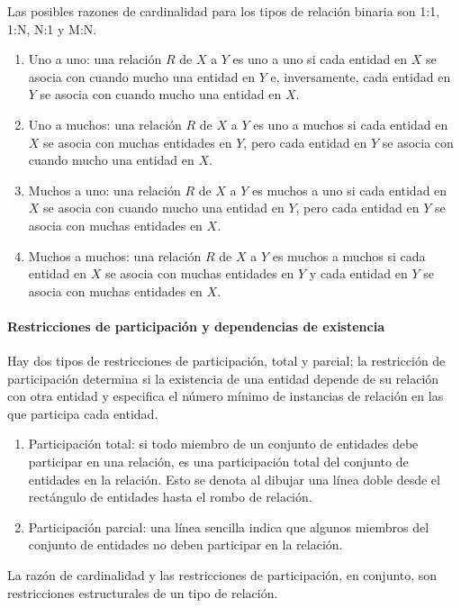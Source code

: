 Las posibles razones de cardinalidad para los tipos de relación binaria son 1:1, 1:N, N:1 y M:N.
\begin{enumerate}
    \item Uno a uno: una relación $R$ de $X$ a $Y$ es uno a uno si cada entidad en $X$ se asocia con cuando mucho una entidad en $Y$ e, inversamente, cada entidad en $Y$ se asocia con cuando mucho una entidad en $X$.
    \item Uno a muchos: una relación $R$ de $X$ a $Y$ es uno a muchos si cada entidad en $X$ se asocia con muchas entidades en $Y$, pero cada entidad en $Y$ se asocia con cuando mucho una entidad en $X$. 
    \item Muchos a uno: una relación $R$ de $X$ a $Y$ es muchos a uno si cada entidad en $X$ se asocia con cuando mucho una entidad en $Y$, pero cada entidad en $Y$ se asocia con muchas entidades en $X$. 
    \item Muchos a muchos: una relación $R$ de $X$ a $Y$ es muchos a muchos si cada entidad en $X$ se asocia con muchas entidades en $Y$ y cada entidad en $Y$ se asocia con muchas entidades en $X$. 
\end{enumerate}

\paragraph*{Restricciones de participación y dependencias de existencia}
Hay dos tipos de restricciones de participación, total y parcial; la restricción de participación determina si la existencia de una entidad depende de su relación con otra entidad y especifica el número mínimo de instancias de relación en las que participa cada entidad.

\begin{enumerate}
    \item Participación total: si todo miembro de un conjunto de entidades debe participar en una relación, es una participación total del conjunto de entidades en la relación. Esto se denota al dibujar una línea doble desde el rectángulo de entidades hasta el rombo de relación.
    \item Participación parcial: una línea sencilla indica que algunos miembros del conjunto de entidades no deben participar en la relación.
\end{enumerate}

La razón de cardinalidad y las restricciones de participación, en conjunto, son restricciones estructurales de un tipo de relación.

